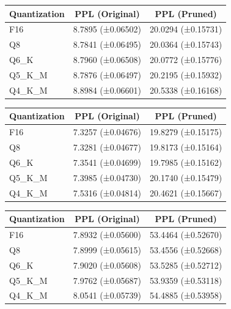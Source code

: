 \documentclass{ifacconf}
\begin{document}
	\begin{table}[H]
		\centering
		\begin{tabular}{|l|c|c|}
			\hline
			\textbf{Quantization} & \textbf{PPL (Original)} & \textbf{PPL (Pruned)} \\ \hline
			F16 & 8.7895 (±0.06502) & 20.0294 (±0.15731) \\ \hline
			Q8 & 8.7841 (±0.06495) & 20.0364 (±0.15743) \\ \hline
			Q6\_K & 8.7960 (±0.06508) & 20.0772 (±0.15776) \\ \hline
			Q5\_K\_M & 8.7876 (±0.06497) & 20.2195 (±0.15932) \\ \hline
			Q4\_K\_M & 8.8984 (±0.06601) & 20.5338 (±0.16168) \\ \hline
		\end{tabular}
		\label{tab:gemma_ppl}
	\end{table}
	
	\begin{table}[H]
		\centering
		\begin{tabular}{|l|c|c|}
			\hline
			\textbf{Quantization} & \textbf{PPL (Original)} & \textbf{PPL (Pruned)} \\ \hline
			F16 & 7.3257 (±0.04676) & 19.8279 (±0.15175) \\ \hline
			Q8 & 7.3281 (±0.04677) & 19.8173 (±0.15164) \\ \hline
			Q6\_K & 7.3541 (±0.04699) & 19.7985 (±0.15162) \\ \hline
			Q5\_K\_M & 7.3985 (±0.04730) & 20.1740 (±0.15479) \\ \hline
			Q4\_K\_M & 7.5316 (±0.04814) & 20.4621 (±0.15667) \\ \hline
		\end{tabular}
		\label{tab:llama_ppl}
	\end{table}
	
	\begin{table}[H]
		\centering
		\begin{tabular}{|l|c|c|}
			\hline
			\textbf{Quantization} & \textbf{PPL (Original)} & \textbf{PPL (Pruned)} \\ \hline
			F16 & 7.8932 (±0.05600) & 53.4464 (±0.52670) \\ \hline
			Q8 & 7.8999 (±0.05615) & 53.4556 (±0.52668) \\ \hline
			Q6\_K & 7.9020 (±0.05608) & 53.5285 (±0.52712) \\ \hline
			Q5\_K\_M & 7.9762 (±0.05687) & 53.9359 (±0.53118) \\ \hline
			Q4\_K\_M & 8.0541 (±0.05739) & 54.4885 (±0.53958) \\ \hline
		\end{tabular}
		\label{tab:qwen_ppl}
	\end{table}
	
\end{document}
